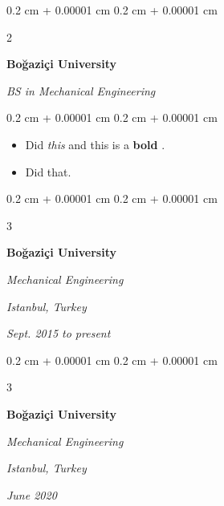 \documentclass[10pt, letterpaper]{article}
\newenvironment{highlights}{
    \begin{itemize}[
        topsep=0.10 cm,
        parsep=0.10 cm,
        partopsep=0pt,
        itemsep=0pt,
        leftmargin=0.4 cm + 10pt + 0.6 cm
    ]
}{
    \end{itemize}
} %
\newenvironment{onecolentry}{
    \begin{adjustwidth}{
        0.2 cm + 0.00001 cm
    }{
        0.2 cm + 0.00001 cm
    }
}{
    \end{adjustwidth}
} %
\newenvironment{onecolentrybulleted}{
    \onecolentry
    \setcolumnwidth{0.6 cm, \fill}
    \begin{paracol}{2}
    \vspace*{\fill}
    \textbullet
    \vspace*{3px}
    \vspace*{\fill}
    \switchcolumn
}{
    \end{paracol}
    \endonecolentry
} %
\newenvironment{threecolentry}[3][]{
    \onecolentry
    \def\thirdColumn{#3}
    \setcolumnwidth{0.6 cm, \fill, 4.5 cm}
    \begin{paracol}{3}
    #2 \switchcolumn
}{
    \switchcolumn \raggedleft \thirdColumn
    \end{paracol}
    \endonecolentry
} %
\let\hrefWithoutArrow\href
\renewcommand{\href}[2]{\hrefWithoutArrow{#1}{\mbox{\ifthenelse{\equal{#2}{}}{ }{#2 }\raisebox{.15ex}{\footnotesize \faExternalLink*}}}}
\begin{document}
        \vspace{0.2 cm-3px}

        \begin{onecolentrybulleted}
            \textbf{Boğaziçi University}

            \textit{BS in Mechanical Engineering}
        \end{onecolentrybulleted}

        \vspace{0.10 cm-3px}
        \begin{onecolentry}
            \begin{highlights}
                \item Did \textit{this} and this is a \textbf{bold} \href{https://example.com}{link}.
                \item Did that.
            \end{highlights}
        \end{onecolentry}


        \vspace{0.2 cm-3px}

        \begin{threecolentry}{
            \vspace*{\fill}
            \textbullet
            \vspace*{3px}
            \vspace*{\fill}
        }{
        \textit{Istanbul, Turkey}    
            
        \textit{Sept. 2015 to present}}
            \textbf{Boğaziçi University}

            \textit{Mechanical Engineering}
        \end{threecolentry}



        \vspace{0.2 cm-3px}

        \begin{threecolentry}{
            \vspace*{\fill}
            \textbullet
            \vspace*{3px}
            \vspace*{\fill}
        }{
        \textit{Istanbul, Turkey}    
            
        \textit{June 2020}}
            \textbf{Boğaziçi University}

            \textit{Mechanical Engineering}
        \end{threecolentry}
\end{document}
